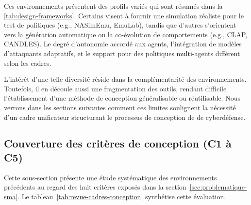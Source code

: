 \medskip

Ces environnements présentent des profils variés qui sont résumés dans la \autoref{tab:design-frameworks}. Certains visent à fournir une simulation réaliste pour le test de politiques (e.g., NASimEmu, EmuLab), tandis que d'autres s'orientent vers la génération automatique ou la co-évolution de comportements (e.g., CLAP, CANDLES). Le degré d'autonomie accordé aux agents, l'intégration de modèles d'attaquants adaptatifs, et le support pour des politiques multi-agents diffèrent selon les cadres.

L'intérêt d'une telle diversité réside dans la complémentarité des environnements. Toutefois, il en découle aussi une fragmentation des outils, rendant difficile l'établissement d'une méthode de conception généralisable ou réutilisable. Nous verrons dans les sections suivantes comment ces limites soulignent la nécessité d'un cadre unificateur structurant le processus de conception de  de cyberdéfense.

\subsection{Couverture des critères de conception (C1 à C5)}

Cette sous-section présente une étude systématique des environnements précédents au regard des huit critères exposés dans la section~\ref{sec:problematique-sma}. Le tableau~\ref{tab:revue-cadres-conception} synthétise cette évaluation.

